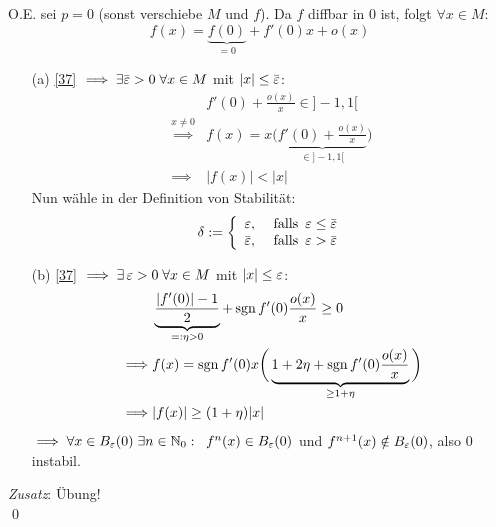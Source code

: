 \documentclass[a4paper]{article}
\begin{document}
\begin{Beweis}
O.E. sei $p=0$ (sonst verschiebe $M$ und $f$). Da $f$ diffbar in 0 ist, folgt $\forall x\in M$: 
\[f(x)=\underbrace{f(0)}_{=0}+f'(0)x+o(x)\tag{$*$}\label{37}\]
\begin{itemize}
\item[(a)] \eqref{37} $\implies \exists\bar{\operatorname{\varepsilon}}>0\;\forall x\in M$ mit $|x|\le\bar{\operatorname{\varepsilon}}$:
\begin{align*}
&f'(0)+\frac{o(x)}{x}\in]-1,1[\\
\overset{x\ne 0}{\implies}& f(x)=x\bigg(\underbrace{f'(0)+\frac{o(x)}{x}}_{\in]-1,1[}\bigg)\\
\implies& |f(x)|<|x|
\end{align*}
Nun wähle in der Definition von Stabilität:
\[\delta:=\left\{\begin{array}{cc}
\operatorname{\varepsilon},&\text{ falls } \operatorname{\varepsilon}\le\bar{\operatorname{\varepsilon}}\\
\bar{\operatorname{\varepsilon}},&\text{ falls } \operatorname{\varepsilon}>\bar{\operatorname{\varepsilon}}
\end{array}\right.\]

\item[(b)] \eqref{37} $\implies\exists\operatorname{\varepsilon}>0\;\forall x\in M$ mit $|x|\le \operatorname{\varepsilon}$:
\begin{align*}
&\underbrace{\frac{|f'(0)|-1}{2}}_{=:\eta>0}+\operatorname{\mathrm{sgn}} f'(0)\frac{o(x)}{x}\ge0\\
\implies & f(x)=\operatorname{\mathrm{sgn}} f'(0)x\bigg(\underbrace{1+2\eta+\operatorname{\mathrm{sgn}} f'(0)\frac{o(x)}{x}}_{\ge 1+\eta}\bigg)\\
\implies& |f(x)|\ge(1+\eta)|x|
\end{align*}
$\implies \forall x\in B_{\operatorname{\varepsilon}}(0)\;\exists n\in\operatorname{\mathbb N}_0:\;\;f^n(x)\in B_{\operatorname{\varepsilon}}(0)$ und $f^{n+1}(x)\notin B_{\operatorname{\varepsilon}}(0)$, also 0 instabil.
\end{itemize}
\textit{Zusatz}: Übung!\\\qed
\end{Beweis}
\end{document}
